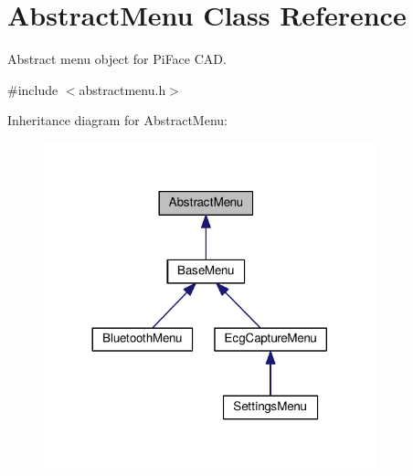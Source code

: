 \hypertarget{classAbstractMenu}{}\section{Abstract\+Menu Class Reference}
\label{classAbstractMenu}


Abstract menu object for Pi\+Face C\+AD.  




{\ttfamily \#include $<$abstractmenu.\+h$>$}



Inheritance diagram for Abstract\+Menu\+:
\nopagebreak
\begin{figure}[H]
\begin{center}
\leavevmode
\includegraphics[width=272pt]{classAbstractMenu__inherit__graph}
\end{center}
\end{figure}
